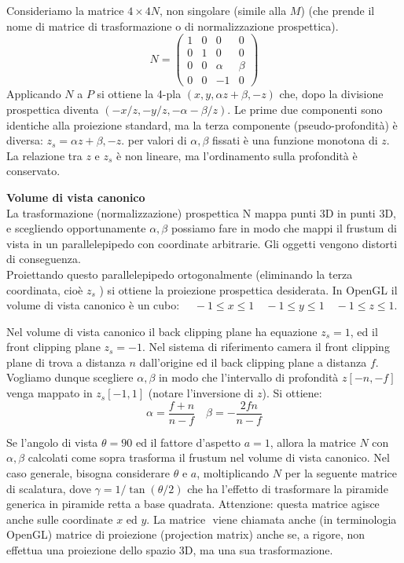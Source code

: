 \documentclass[a4paper, 10pt]{article}
\begin{document}
		Consideriamo la matrice $ 4 \times 4 N $, non singolare (simile alla $ M $) (che prende il nome di matrice di trasformazione o di normalizzazione prospettica).
		\[
			N =
			\begin{pmatrix}
				1 & 0 & 0 & 0 \\
				0 & 1 & 0 & 0 \\
				0 & 0 & \alpha & \beta \\
				0 & 0 & -1 & 0	
			\end{pmatrix}
		\]
		Applicando $ N $ a $ P $ si ottiene la 4-pla $ (x, y, \alpha z + \beta,-z) $ che, dopo la divisione prospettica diventa $ (-x/z,-y/z, -\alpha-\beta/z) $. Le prime due componenti sono identiche alla proiezione standard, ma la terza componente (pseudo-profondità) è diversa: 
		$ z_s = \alpha z +\beta, -z $. per valori di $ \alpha, \beta $ fissati è una funzione monotona di $ z $. La relazione tra $ z $ e $ z_s $ è non lineare, ma l’ordinamento sulla
		profondità è conservato.
	
		\noindent
		\textbf{Volume di vista canonico}\\
		La trasformazione (normalizzazione) prospettica N mappa punti 3D in punti 3D, e scegliendo opportunamente $ \alpha, \beta $ possiamo fare in modo che mappi il frustum di vista in un parallelepipedo con coordinate arbitrarie. Gli oggetti vengono distorti di conseguenza.\\
		Proiettando questo parallelepipedo ortogonalmente (eliminando la terza coordinata, cioè 
		$ z_s $ ) si ottiene la proiezione prospettica desiderata. In OpenGL il volume di vista canonico è un cubo:	$\quad -1\leq x\leq 1 \quad -1\leq y\leq 1  \quad -1\leq z\leq 1 $.
		
		Nel volume di vista canonico il back clipping plane ha equazione $ z_s = 1 $, ed il front clipping plane $ z_s = -1 $. Nel sistema di riferimento camera il front clipping plane di
		trova a distanza $ n $ dall’origine ed il back clipping plane a distanza $ f $.\\
		Vogliamo dunque scegliere $ \alpha, \beta $ in modo che l’intervallo di profondità $ z [-n,-f] $ venga mappato in $ z_s [-1, 1] $ (notare l’inversione di $ z $).
		Si ottiene:
		\[
			\alpha = \dfrac{f + n}{n - f} \quad \beta = -\dfrac{2fn}{n - f}
		\]
	
		Se l’angolo di vista $ \theta = 90 $ ed il fattore d’aspetto $ a = 1 $, allora la matrice $ N $ con $ \alpha , \beta $ calcolati come sopra trasforma il frustum nel volume di vista canonico.
		Nel caso generale, bisogna considerare $ \theta $ e $ a $, moltiplicando $ N $ per la seguente matrice di scalatura, dove $ \gamma = 1/\tan(\theta/2) $ che ha l’effetto di trasformare la piramide generica in piramide retta a base quadrata. Attenzione: questa matrice agisce anche sulle coordinate $ x $ ed $ y $. La matrice $  $ viene chiamata anche (in terminologia OpenGL)
		matrice di proiezione (projection matrix) anche se, a rigore, non effettua una proiezione dello spazio 3D, ma una sua trasformazione.
	
\end{document}

